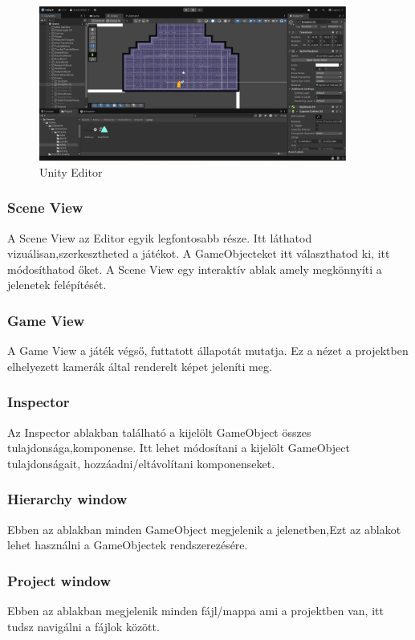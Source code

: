 \documentclass[
]{thesis-ekf}
\theoremstyle{definition}
\theoremstyle{remark}
\begin{document}
\begin{figure}[h!]
	\centering
	\includegraphics[width=0.9\textwidth]{UnityEditorKep.png}
	\caption{Unity Editor}
	\label{fig:kep}
\end{figure}

\subsubsection{Scene View}
A Scene View az Editor egyik legfontosabb része. Itt láthatod vizuálisan,szerkesztheted a játékot. A GameObjecteket itt választhatod ki, itt módosíthatod őket. A Scene View egy interaktív ablak amely megkönnyíti a jelenetek felépítését.
\subsubsection{Game View}
A Game View a játék végső, futtatott állapotát mutatja. Ez a nézet a projektben elhelyezett kamerák által renderelt képet jeleníti meg.

\subsubsection{Inspector}
Az Inspector ablakban található a kijelölt GameObject összes tulajdonsága,komponense. Itt lehet módosítani a kijelölt GameObject tulajdonságait, hozzáadni/eltávolítani komponenseket.

\subsubsection{Hierarchy window}
Ebben az ablakban minden GameObject megjelenik a jelenetben,Ezt az ablakot lehet használni a GameObjectek rendszerezésére.
\subsubsection{Project window}
Ebben az ablakban megjelenik minden fájl/mappa ami a projektben van, itt tudsz navigálni a fájlok között.
\end{document}
